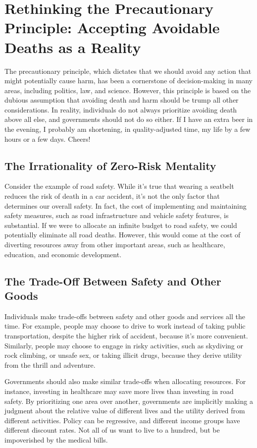 \documentclass{article}
\begin{document}
\section{Rethinking the Precautionary Principle: Accepting Avoidable Deaths as a Reality}

The precautionary principle, which dictates that we should avoid any action that might potentially cause harm, has been a cornerstone of decision-making in many areas, including politics, law, and science. However, this principle is based on the dubious assumption that avoiding death and harm should be trump all other considerations. In reality, individuals do not always prioritize avoiding death above all else, and governments should not do so either. If I have an extra beer in the evening, I probably am shortening, in quality-adjusted time, my life by a few hours or a few days. Cheers!

\subsection{The Irrationality of Zero-Risk Mentality}

Consider the example of road safety. While it's true that wearing a seatbelt reduces the risk of death in a car accident, it's not the only factor that determines our overall safety. In fact, the cost of implementing and maintaining safety measures, such as road infrastructure and vehicle safety features, is substantial. If we were to allocate an infinite budget to road safety, we could potentially eliminate all road deaths. However, this would come at the cost of diverting resources away from other important areas, such as healthcare, education, and economic development.

\subsection{The Trade-Off Between Safety and Other Goods}

Individuals make trade-offs between safety and other goods and services all the time. For example, people may choose to drive to work instead of taking public transportation, despite the higher risk of accident, because it's more convenient. Similarly, people may choose to engage in risky activities, such as skydiving or rock climbing, or unsafe sex, or taking illicit drugs, because they derive utility from the thrill and adventure. 

Governments should also make similar trade-offs when allocating resources. For instance, investing in healthcare may save more lives than investing in road safety. By prioritizing one area over another, governments are implicitly making a judgment about the relative value of different lives and the utility derived from different activities. Policy can be regressive, and different income groups have different discount rates. Not all of us want to live to a hundred, but be impoverished by the medical bills.
\end{document}
